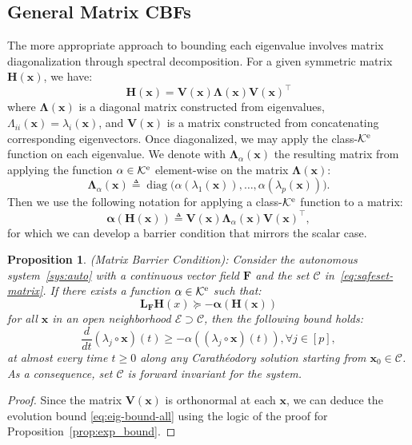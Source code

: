 \documentclass[10pt,twocolumn,twoside]{IEEEtran}
\newcommand{\until}[1]{[#1]}
\newcommand{\longthmtitle}[1]{\mbox{}{\textit{(#1):}}}
\newcommand{\Cc}{\mathcal{C}}
\newcommand{\Ec}{\mathcal{E}}
\newcommand{\Kc}{\mathcal{K}}
\newcommand{\Ke}{\Kc^{\rm e}}
\newcommand{\defeq}{\triangleq}
\newtheorem{proposition}{Proposition}
\theoremstyle{definition}
\newcommand{\bx}{\mathbf{x}}
\newcommand{\bF}{\mathbf{F}}
\newcommand{\bH}{\mathbf{H}}
\newcommand{\bL}{\mathbf{L}}
\newcommand{\bV}{\mathbf{V}}
\newcommand{\bLambda}{\boldsymbol{\Lambda}}
\newcommand{\balpha}{\boldsymbol{\alpha}}
\newcommand{\diag}{{\operatorname{diag}}}
\begin{document}
\subsection{General Matrix CBFs}
The more appropriate approach to bounding each eigenvalue involves matrix diagonalization through spectral decomposition. For a given symmetric matrix $\bH(\bx)$, we have:
$$
    \bH(\bx) = \bV(\bx)\bLambda(\bx)\bV(\bx)^\top
$$
where $\bLambda(\bx)$ is a diagonal matrix constructed from eigenvalues, $\Lambda_{ii}(\bx)=\lambda_i(\bx)$, and $\bV(\bx)$ is a matrix constructed from concatenating corresponding eigenvectors. Once diagonalized, we may apply the class-$\Ke$ function on each eigenvalue. We denote with $\bLambda_\alpha(\bx)$ the resulting matrix from applying the function $\alpha\in\Ke$ element-wise on the matrix $\bLambda(\bx)$:
    $$
        \bLambda_\alpha(\bx) \defeq \diag\big(\alpha(\lambda_1(\bx)),\dots,\alpha(\lambda_p(\bx))\big).
    $$
    Then we use the following notation for applying a class-$\Ke$ function to a matrix:
\begin{equation}
\label{eq:balpha}
        \balpha(\bH(\bx)) \defeq \bV(\bx)\bLambda_\alpha(\bx)\bV(\bx)^\top,
\end{equation}
    for which we can develop a barrier condition that mirrors the scalar case.
\begin{proposition}\longthmtitle{Matrix Barrier Condition}
    \label{prop:BC-diagonalization}
    Consider the autonomous system~\eqref{sys:auto} with a continuous vector field $\bF$  and the set $\Cc$ in~\eqref{eq:safeset-matrix}. If there exists a function $\alpha\in\Ke$ such that:
    \begin{equation}\label{eq:BC-diagonalization}
        \bL_\bF\bH(x) \succeq -\balpha(\bH(\bx))
    \end{equation}
    for all $\bx$ in an open neighborhood $\Ec\supset\Cc$, then the following bound holds:
    \begin{equation}\label{eq:eig-bound-all}
        \frac{d}{dt}(\lambda_j\circ \bx)(t) \geq -\alpha((\lambda_j\circ\bx)(t)), \forall j\in\until{p},
    \end{equation}
    at almost every time $t\geq0$ along any Carath\'eodory solution starting from $\bx_0\in\Cc$. As a consequence, set $\Cc$ is forward invariant for the system.
\end{proposition}
\begin{proof}
    Since the matrix $\bV(\bx)$ is orthonormal at each $\bx$, we can deduce the evolution bound \eqref{eq:eig-bound-all} using the logic of the proof for Proposition~\ref{prop:exp_bound}.
\end{proof}
\end{document}
